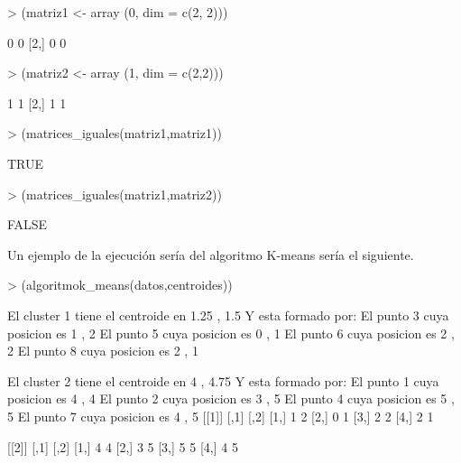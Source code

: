 \documentclass[parskip=full]{scrartcl}
\begin{document}
\begin{itemize}
\begin{itemize}
\begin{Schunk}
\begin{Sinput}
> (matriz1 <- array (0, dim = c(2, 2)))
\end{Sinput}
\begin{Soutput}
     [,1] [,2]
[1,]    0    0
[2,]    0    0
\end{Soutput}
\begin{Sinput}
> (matriz2 <- array (1, dim = c(2,2)))
\end{Sinput}
\begin{Soutput}
     [,1] [,2]
[1,]    1    1
[2,]    1    1
\end{Soutput}
\begin{Sinput}
> (matrices_iguales(matriz1,matriz1))
\end{Sinput}
\begin{Soutput}
[1] TRUE
\end{Soutput}
\begin{Sinput}
> (matrices_iguales(matriz1,matriz2))
\end{Sinput}
\begin{Soutput}
[1] FALSE
\end{Soutput}
\end{Schunk}

        
    \end{itemize}
    
\end{itemize}

Un ejemplo de la ejecución sería del algoritmo K-means sería el siguiente.


\begin{Schunk}
\begin{Sinput}
> (algoritmok_means(datos,centroides))
\end{Sinput}
\begin{Soutput}
El cluster 1 tiene el centroide en 1.25 , 1.5 
Y esta formado por:
El punto 3 cuya posicion es 1 , 2 
El punto 5 cuya posicion es 0 , 1 
El punto 6 cuya posicion es 2 , 2 
El punto 8 cuya posicion es 2 , 1 


El cluster 2 tiene el centroide en 4 , 4.75 
Y esta formado por:
El punto 1 cuya posicion es 4 , 4 
El punto 2 cuya posicion es 3 , 5 
El punto 4 cuya posicion es 5 , 5 
El punto 7 cuya posicion es 4 , 5 
[[1]]
     [,1] [,2]
[1,]    1    2
[2,]    0    1
[3,]    2    2
[4,]    2    1

[[2]]
     [,1] [,2]
[1,]    4    4
[2,]    3    5
[3,]    5    5
[4,]    4    5
\end{Soutput}
\end{Schunk}
\end{document}
